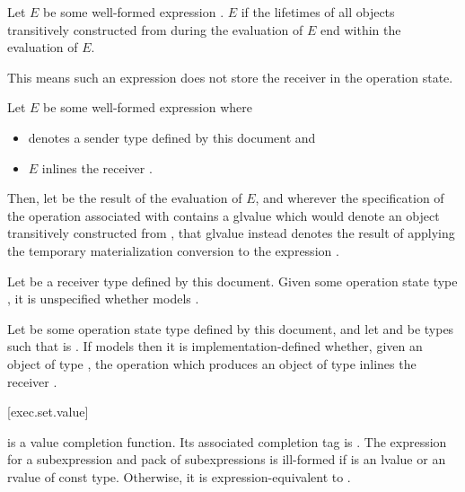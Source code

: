 \pnum
Let $E$ be some well-formed expression .
$E$  
if the lifetimes of all objects transitively constructed from
 during the evaluation of $E$
end within the evaluation of $E$.
\begin{note}
This means such an expression does not store the receiver in the operation state.
\end{note}

\pnum
Let $E$ be some well-formed expression  where
\begin{itemize}
\item
{} denotes a sender type defined by this document and
\item
$E$ inlines the receiver .
\end{itemize}
Then, let  be the result of the evaluation of $E$, and
wherever the specification of the operation associated with 
contains a glvalue
which would denote an object transitively constructed from ,
that glvalue instead denotes the result of applying
the temporary materialization conversion to the expression
.

\pnum
Let  be a receiver type defined by this document.
Given some operation state type ,
it is unspecified
whether  models .

\pnum
Let  be some operation state type defined by this document,
and let  and  be types such that
 is .
If  models 
then it is implementation-defined whether,
given an object  of type ,
the  operation which produces an object of type 
inlines the receiver .

[exec.set.value]{}

\pnum
{} is a value completion function.
Its associated completion tag is .
The expression 
for a subexpression  and
pack of subexpressions  is ill-formed
if  is an lvalue or an rvalue of const type.
Otherwise, it is expression-equivalent to
.

